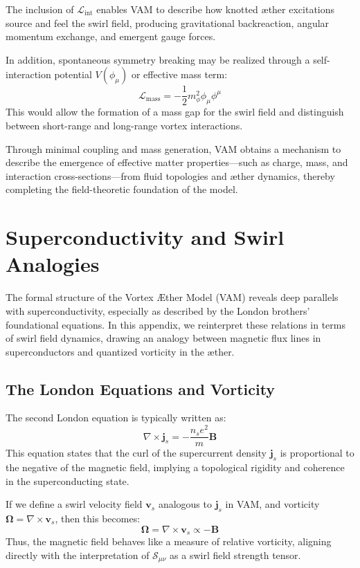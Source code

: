 The inclusion of $\mathcal{L}_{\text{int}}$ enables VAM to describe how knotted æther excitations source and feel the swirl field, producing gravitational backreaction, angular momentum exchange, and emergent gauge forces.

In addition, spontaneous symmetry breaking may be realized through a self-interaction potential $V(\phi_\mu)$ or effective mass term:
\begin{equation}
    \mathcal{L}_{\text{mass}} = -\frac{1}{2} m_\phi^2 \phi_\mu \phi^\mu
\end{equation}
This would allow the formation of a mass gap for the swirl field and distinguish between short-range and long-range vortex interactions.

Through minimal coupling and mass generation, VAM obtains a mechanism to describe the emergence of effective matter properties---such as charge, mass, and interaction cross-sections---from fluid topologies and æther dynamics, thereby completing the field-theoretic foundation of the model.

\section{Superconductivity and Swirl Analogies}
The formal structure of the Vortex Æther Model (VAM) reveals deep parallels with superconductivity, especially as described by the London brothers' foundational equations. In this appendix, we reinterpret these relations in terms of swirl field dynamics, drawing an analogy between magnetic flux lines in superconductors and quantized vorticity in the æther.

\subsection{The London Equations and Vorticity}
The second London equation is typically written as:
\begin{equation}
    \nabla \times \mathbf{j}_s = -\frac{n_s e^2}{m} \mathbf{B}
\end{equation}
This equation states that the curl of the supercurrent density $\mathbf{j}_s$ is proportional to the negative of the magnetic field, implying a topological rigidity and coherence in the superconducting state.

If we define a swirl velocity field $\mathbf{v}_s$ analogous to $\mathbf{j}_s$ in VAM, and vorticity $\boldsymbol{\Omega} = \nabla \times \mathbf{v}_s$, then this becomes:
\begin{equation}
    \boldsymbol{\Omega} = \nabla \times \mathbf{v}_s \propto -\mathbf{B}
\end{equation}
Thus, the magnetic field behaves like a measure of relative vorticity, aligning directly with the interpretation of $\mathcal{S}_{\mu\nu}$ as a swirl field strength tensor.

